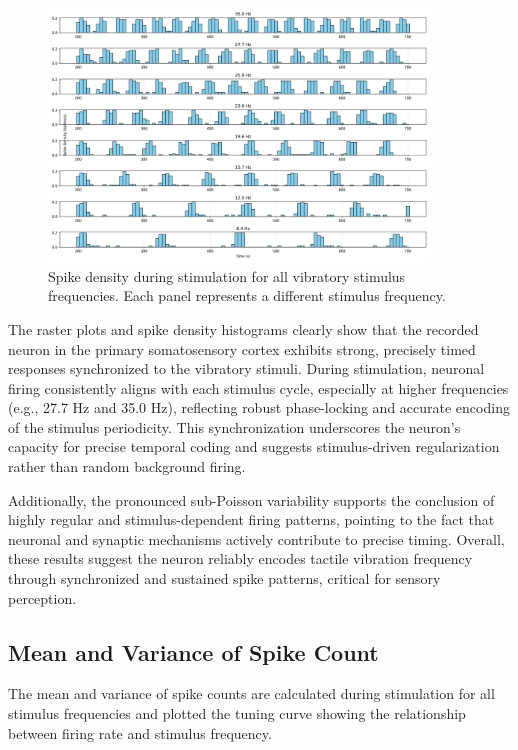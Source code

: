 \documentclass{article}
\begin{document}
\begin{figure}[H]
\centering
\includegraphics[width=0.9\textwidth]{Fig7.png}
\caption{Spike density during stimulation for all vibratory stimulus frequencies. Each panel represents a different stimulus frequency.}
\label{fig:all_densities}
\end{figure}

The raster plots and spike density histograms clearly show that the recorded neuron in the primary somatosensory cortex exhibits strong, precisely timed responses synchronized to the vibratory stimuli. During stimulation, neuronal firing consistently aligns with each stimulus cycle, especially at higher frequencies (e.g., 27.7 Hz and 35.0 Hz), reflecting robust phase-locking and accurate encoding of the stimulus periodicity. 
This synchronization underscores the neuron's capacity for precise temporal coding and suggests stimulus-driven regularization rather than random background firing.

Additionally, the pronounced sub-Poisson variability supports the conclusion of highly regular and stimulus-dependent firing patterns, pointing to the fact that neuronal and synaptic mechanisms actively contribute to precise timing. 
Overall, these results suggest the neuron reliably encodes tactile vibration frequency through synchronized and sustained spike patterns, critical for sensory perception.

\subsection{Mean and Variance of Spike Count}

The mean and variance of spike counts are calculated during stimulation for all stimulus frequencies and plotted the tuning curve showing the relationship between firing rate and stimulus frequency.
\end{document}
